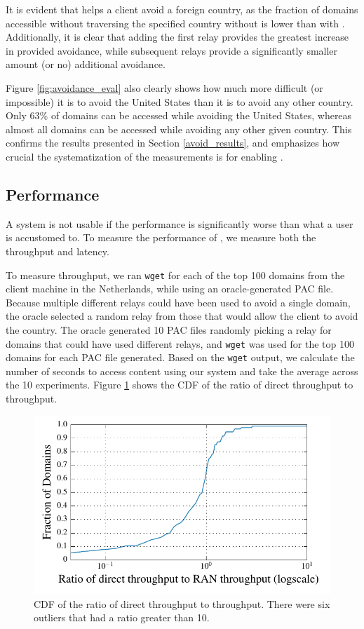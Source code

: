 It is evident that \system{} helps a client avoid a foreign country, as the 
fraction of domains accessible without traversing 
the specified country without \system{} is lower than with \system{}.  Additionally, 
it is clear that adding the first relay provides the greatest increase in 
provided avoidance, while subsequent relays provide a significantly 
smaller amount (or no) additional avoidance.

Figure \ref{fig:avoidance_eval} also clearly shows how much more difficult (or 
impossible) it is to avoid the United States than it is to avoid any other 
country.  Only 63\% of domains can be accessed while avoiding the United States, 
whereas almost all domains can be accessed while avoiding any other given 
country.  This confirms the results presented in Section \ref{avoid_results}, and 
emphasizes how crucial the systematization of the measurements is for enabling 
\system{}.

\subsection{Performance}
A system is not usable if the performance is significantly worse than what a user
is accustomed to.  To measure the performance of \system{}, we measure both 
the throughput and latency.

To measure throughput, we ran {\tt wget} for each 
of the top 100 domains from the client machine in the Netherlands, while 
using an oracle-generated PAC file.  Because multiple different relays could have been 
used to avoid a single domain, the oracle selected a random relay from those 
that would allow the client to avoid the country.  The oracle generated 
10 PAC files randomly picking a relay for domains that could have used 
different relays, and {\tt wget} was used for the top 100 domains for each 
PAC file generated.  Based on the {\tt wget} output, we calculate the number 
of seconds to access content using our system and take the average across the 
10 experiments. Figure \ref{fig:throughput} shows 
the CDF of the ratio of direct throughput to \system{} throughput. 

\begin{figure}[t]
\centering
\includegraphics[width=.5\textwidth]{throughput}
\caption{CDF of the ratio of direct throughput to \system{} throughput.  
There were six outliers that had a ratio greater than 10.}
\label{fig:throughput}
\end{figure}

